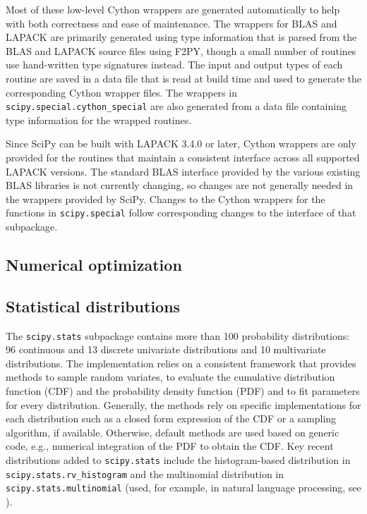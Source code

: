 \documentclass[fleqn,10pt]{wlscirep}
\begin{document}
Most of these low-level Cython wrappers are generated automatically to help
with both correctness and ease of maintenance.  The wrappers for BLAS and
LAPACK are primarily generated using type information that is parsed from the
BLAS and LAPACK source files using F2PY\cite{peterson2009f2py}, though a small
number of routines use hand-written type signatures instead.  The input and
output types of each routine are saved in a data file that is read at build
time and used to generate the corresponding Cython wrapper files.  The wrappers
in \texttt{scipy.{\allowbreak}special.{\allowbreak}cython\_special} are also
generated from a data file containing type information for the wrapped
routines.

Since SciPy can be built with LAPACK 3.4.0 or later, Cython wrappers are only
provided for the routines that maintain a consistent interface across all
supported LAPACK versions.  The standard BLAS interface provided by the various
existing BLAS libraries is not currently changing, so changes are not generally
needed in the wrappers provided by SciPy.  Changes to the Cython wrappers for
the functions in \texttt{scipy.{\allowbreak}special} follow corresponding
changes to the interface of that subpackage.

\subsection*{Numerical optimization}



\subsection*{Statistical distributions}

The \texttt{scipy.stats} subpackage contains more than 100 probability
distributions: 96 continuous and 13 discrete univariate distributions
and 10 multivariate distributions. The implementation relies on a
consistent framework that provides methods to sample random variates,
to evaluate the cumulative distribution function (CDF) and the probability
density function (PDF) and to fit parameters for every distribution.
Generally, the methods rely on specific implementations for each
distribution such as a closed form expression of the CDF or a sampling
algorithm, if available. Otherwise, default methods are used
based on generic code, e.g., numerical integration of the PDF to
obtain the CDF\@.
Key recent distributions added to \texttt{scipy.stats} include the
histogram-based distribution in \texttt{scipy.stats.rv\_histogram}
and the multinomial distribution in \texttt{scipy.stats.multinomial}
(used, for example, in natural language processing, see
\cite{Griffiths5228}).
\end{document}
